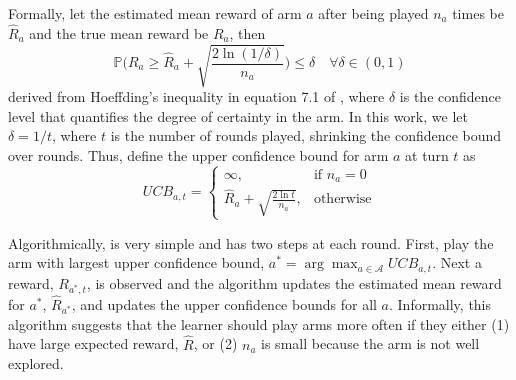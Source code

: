 Formally, let the estimated mean reward of arm $a$ after being played $n_{a}$ times be $\hat{R}_{a}$ and the true mean reward be $R_{a}$, then
\[
\mathbb{P}\bigg(R_{a} \ge \hat{R}_{a} + \sqrt{\frac{2\ln (1/\delta)}{n_{a}}}\bigg) \le\delta \quad\forall \delta\in (0,1)
\]
derived from Hoeffding's inequality in equation 7.1 of \citet{lattimore_szepesvári_2020}, where $\delta$ is the confidence level that quantifies the degree of certainty in the arm. In this work, we let $\delta = 1/t$, where $t$ is the number of rounds played, shrinking the confidence bound over rounds. Thus, define the upper confidence bound for arm $a$ at turn $t$ as
\begin{equation}
\label{eq:ucb}
UCB_{a,t} = 
\begin{cases}
\infty,& \text{if } n_{a}=0 \\
\hat{R}_{a}+\sqrt{\frac{2\ln t}{n_{a}}},& \text{otherwise}
\end{cases}
\end{equation}

Algorithmically, \ucb{} is very simple and has two steps at each round. First, play the arm with largest upper confidence bound, $a^{*}=\arg\max_{a\in\mathcal{A}}UCB_{a,t}$. Next a reward, $R_{a^{*},t}$, is observed and the algorithm updates the estimated mean reward for $a^{*}$, $\hat{R}_{a^{*}}$, and updates the upper confidence bounds for all $a$. Informally, this algorithm suggests that the learner should play arms more often if they either (1) have large expected reward, $\hat{R}$, or (2) $n_{a}$ is small because the arm is not well explored.


